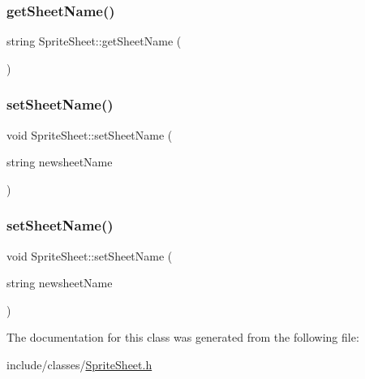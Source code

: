 \subsubsection{\texorpdfstring{get\+Sheet\+Name()}{getSheetName()}\hspace{0.1cm}{\footnotesize\ttfamily [2/2]}}
{\footnotesize\ttfamily string Sprite\+Sheet\+::get\+Sheet\+Name (\begin{DoxyParamCaption}{ }\end{DoxyParamCaption})}

\mbox{\label{classSpriteSheet_ab635dd55f278dc207b00b709b951709f}} 
\subsubsection{\texorpdfstring{set\+Sheet\+Name()}{setSheetName()}\hspace{0.1cm}{\footnotesize\ttfamily [1/2]}}
{\footnotesize\ttfamily void Sprite\+Sheet\+::set\+Sheet\+Name (\begin{DoxyParamCaption}\item[{string}]{newsheet\+Name }\end{DoxyParamCaption})}

\mbox{\label{classSpriteSheet_ab635dd55f278dc207b00b709b951709f}} 
\subsubsection{\texorpdfstring{set\+Sheet\+Name()}{setSheetName()}\hspace{0.1cm}{\footnotesize\ttfamily [2/2]}}
{\footnotesize\ttfamily void Sprite\+Sheet\+::set\+Sheet\+Name (\begin{DoxyParamCaption}\item[{string}]{newsheet\+Name }\end{DoxyParamCaption})}



The documentation for this class was generated from the following file\+:\begin{DoxyCompactItemize}
\item 
include/classes/\hyperlink{classes_2SpriteSheet_8h}{Sprite\+Sheet.\+h}\end{DoxyCompactItemize}

